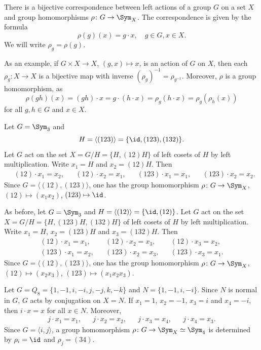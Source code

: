 There is a bijective correspondence between 
left actions of a group $G$ on a set $X$ and
group homomorphisms 
$\rho\colon G\to\Sym_X$. The correspondence is given by
the formula 
\[
\rho(g)(x)=g\cdot x,\quad g\in G,x\in X.
\]
We will write $\rho_g=\rho(g)$.

As an example, if $G\times X\to X$, $(g,x)\mapsto x$, is 
an action of $G$ on $X$, then
each $\rho_g\colon X\to X$ is a bijective map with inverse 
$(\rho_g)^{-1}=\rho_{g^{-1}}$. Moreover, 
 $\rho$ is a group homomorphism, as 
\[
\rho(gh)(x)=(gh)\cdot x=g\cdot (h\cdot x)=\rho_g(h\cdot x)=\rho_g(\rho_h(x))
\]
for all $g,h\in G$ and $x\in X$.

\begin{example}
Let $G=\Sym_3$ and 
\[
H=\langle (123)\rangle=\{\id,(123),(132)\}.
\]
Let $G$ act on the set $X=G/H=\{H,(12)H\}$ of left cosets of $H$ 
by left multiplication. Write 
$x_1=H$ and $x_2=(12)H$. Then
\begin{align*}
&(12)\cdot x_1=x_2,
&&(12)\cdot x_2=x_1,
&&(123)\cdot x_1=x_1,
&&(123)\cdot x_2=x_2.
\end{align*}
Since $G=\langle (12),(123)\rangle$, one has the group 
homomorphism 
$\rho\colon G\to\Sym_{X}$, 
$(12)\mapsto (x_1x_2)$, $(123)\mapsto\id$.
\end{example}

\begin{example}
As before, let $G=\Sym_3$ and $H=\langle (12)\rangle=\{\id,(12)\}$. Let $G$ act on the set $X=G/H=\{H,(123
)H,(132)H\}$ of left cosets of $H$ by left multiplication. Write 
$x_1=H$, $x_2=(123)H$ and $x_3=(132)H$. Then
\begin{align*}
(12)\cdot x_1=x_1,&& (12)\cdot x_2=x_3, && (12)\cdot x_3=x_2,\\
(123)\cdot x_1=x_2, && (123)\cdot x_2=x_3, &&(123)\cdot x_3=x_1.
\end{align*}
Since $G=\langle (12),(123)\rangle$, one has the group
homomorphism 
$\rho\colon G\to\Sym_{X}$, $(12)\mapsto (x_2x_3)$, $(123)\mapsto (x_1x_2x_3)$.
\end{example}


\begin{example}
Let $G=Q_8=\{1,-1,i,-i,j,-j,k,-k\}$ and $N=\{1,-1,i,-i\}$. Since
$N$ is normal in $G$, $G$
acts by conjugation on $X=N$.
If $x_1=1$, $x_2=-1$, $x_3=i$ and $x_4=-i$, then
$i\cdot x=x$ for all $x\in N$. Moreover, 
\begin{align*}
j\cdot x_1=x_1, && j\cdot x_2=x_2, && j\cdot x_3=x_4, && j\cdot x_4=x_3.
\end{align*}
Since $G=\langle i,j\rangle$, a group homomorphism $\rho\colon G\to\Sym_X\simeq\Sym_4$ is determined by 
$\rho_i=\id$ and $\rho_j=(34)$.
\end{example}



